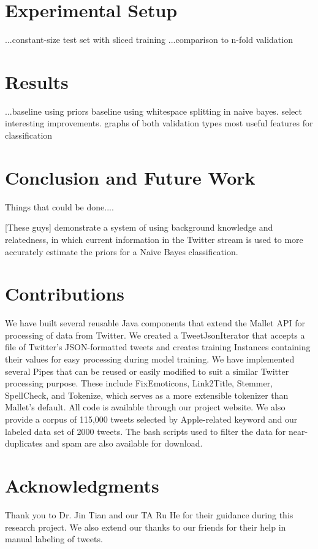 \documentclass[letterpaper]{article}
\begin{document}
\section{Experimental Setup}
...constant-size test set with sliced training
...comparison to n-fold validation

\section{Results}
...baseline using priors
  baseline using whitespace splitting in naive bayes.
  select interesting improvements.
  graphs of both validation types
  most useful features for classification

\section{Conclusion and Future Work}

Things that could be done....

[These guys] demonstrate a system of using background knowledge and relatedness, in which current information in the Twitter stream is used to more accurately estimate the priors for a Naive Bayes classification.

\section{Contributions}
We have built several reusable Java components that extend the Mallet API for processing of data from Twitter. We created a TweetJsonIterator that accepts a file of Twitter's JSON-formatted tweets and creates training Instances containing their values for easy processing during model training. We have implemented several Pipes that can be reused or easily modified to suit a similar Twitter processing purpose. These include FixEmoticons, Link2Title, Stemmer, SpellCheck, and Tokenize, which serves as a more extensible tokenizer than Mallet's default. All code is available through our project website. We also provide a corpus of 115,000 tweets selected by Apple-related keyword and our labeled data set of 2000 tweets. The bash scripts used to filter the data for near-duplicates and spam are also available for download.

\section{ Acknowledgments}
Thank you to Dr. Jin Tian and our TA Ru He for their guidance during this research project. We also extend our thanks to our friends for their help in manual labeling of tweets.
\end{document}
